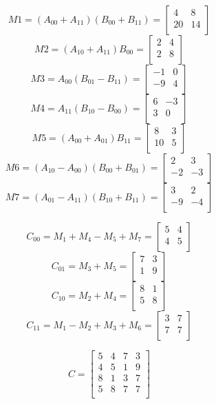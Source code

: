 \documentclass{article}
\begin{document}
\[
M1 = (A_{00} + A_{11})(B_{00} + B_{11}) =
\left[
  \begin{array}{cc}
   4 & 8\\
   20 & 14\\
  \end{array}
\right]
\]
\[
M2 = (A_{10} + A_{11})B_{00} =
\left[
  \begin{array}{cc}
   2 & 4\\
   2 & 8\\
  \end{array}
\right]
\]
\[
M3 = A_{00}(B_{01} − B_{11}) =
\left[
  \begin{array}{cc}
   -1 & 0\\
   -9 & 4\\
  \end{array}
\right]
\]
\[
M4 = A_{11}(B_{10} − B_{00}) =
\left[
  \begin{array}{cc}
   6 & -3\\
   3 & 0\\
  \end{array}
\right]
\]
\[
M5 = (A_{00} + A_{01})B_{11} =
\left[
  \begin{array}{cc}
   8 & 3\\
   10 & 5\\
  \end{array}
\right]
\]
\[
M6 = (A_{10} − A_{00})(B_{00} + B_{01}) =
\left[
  \begin{array}{cc}
   2 & 3\\
   -2 & -3\\
  \end{array}
\right]
\]
\[
M7 = (A_{01} − A_{11})(B_{10} + B_{11}) =
\left[
  \begin{array}{cc}
   3 & 2\\
   -9 & -4\\
  \end{array}
\right]
\]

\[
C_{00} = M_1 + M_4 - M_5 + M_7 =
\left[
  \begin{array}{cc}
   5 & 4\\
   4 & 5\\
  \end{array}
\right]
\]
\[
C_{01} = M_3 + M_5 =
\left[
  \begin{array}{cc}
   7 & 3\\
   1 & 9\\
  \end{array}
\right]
\]
\[
C_{10} = M_2 + M_4 =
\left[
  \begin{array}{cc}
   8 & 1\\
   5& 8\\
  \end{array}
\right]
\]
\[
C_{11} = M_1 - M_2 + M_3 + M_6 =
\left[
  \begin{array}{cc}
   3 & 7\\
   7 & 7\\
  \end{array}
\right]
\]

\[
C =
\left[
\begin{array}{cccc}
5& 4 & 7 &3 \\
4& 5 &1 &9\\
8& 1 &3&7\\
5& 8 &7&7\\
\end{array}
\right]
\]
\end{document}
